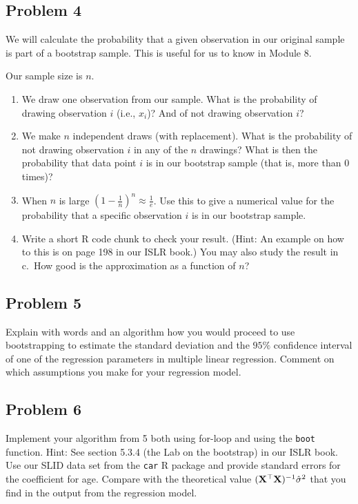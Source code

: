 \documentclass[
]{article}
\providecommand{\tightlist}{%
  \setlength{\itemsep}{0pt}\setlength{\parskip}{0pt}}
\begin{document}
\hypertarget{problem-4}{%
\subsection{Problem 4}\label{problem-4}}

We will calculate the probability that a given observation in our
original sample is part of a bootstrap sample. This is useful for us to
know in Module 8.

Our sample size is \(n\).

\begin{enumerate}
\def\labelenumi{\alph{enumi}.}
\tightlist
\item
  We draw one observation from our sample. What is the probability of
  drawing observation \(i\) (i.e., \(x_i\))? And of not drawing
  observation \(i\)?
\item
  We make \(n\) independent draws (with replacement). What is the
  probability of not drawing observation \(i\) in any of the \(n\)
  drawings? What is then the probability that data point \(i\) is in our
  bootstrap sample (that is, more than \(0\) times)?
\item
  When \(n\) is large \((1-\frac{1}{n})^n \approx \frac{1}{e}\). Use
  this to give a numerical value for the probability that a specific
  observation \(i\) is in our bootstrap sample.
\item
  Write a short R code chunk to check your result. (Hint: An example on
  how to this is on page 198 in our ISLR book.) You may also study the
  result in c.~How good is the approximation as a function of \(n\)?
\end{enumerate}

\hypertarget{problem-5}{%
\subsection{Problem 5}\label{problem-5}}

Explain with words and an algorithm how you would proceed to use
bootstrapping to estimate the standard deviation and the \(95\%\)
confidence interval of one of the regression parameters in multiple
linear regression. Comment on which assumptions you make for your
regression model.

\hypertarget{problem-6}{%
\subsection{Problem 6}\label{problem-6}}

Implement your algorithm from 5 both using for-loop and using the
\texttt{boot} function. Hint: See section 5.3.4 (the Lab on the
bootstrap) in our ISLR book. Use our SLID data set from the \texttt{car}
R package and provide standard errors for the coefficient for age.
Compare with the theoretical value
\(({\bf X}^\top{\bf X})^{-1}\hat{\sigma}^2\) that you find in the output
from the regression model.
\end{document}
